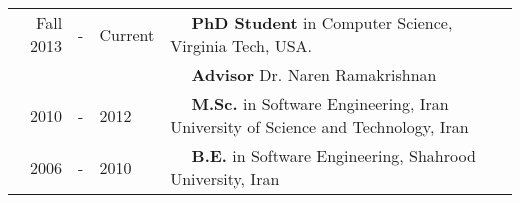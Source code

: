 
  \tabcolsep=0.11cm
  \begin{tabular}{rclll}
    Fall 2013 & - & Current & $\quad$ {\bf PhD Student} in Computer Science, Virginia Tech, USA. \\
                & & & $\quad$ \textbf{Advisor} Dr. Naren Ramakrishnan \\
    2010 & - & 2012 & $\quad$ {\bf M.Sc.} in Software Engineering, Iran University of Science and Technology, Iran \\
    2006 & - & 2010 & $\quad$ {\bf B.E.} in Software Engineering, Shahrood University, Iran \\
  \end{tabular}

